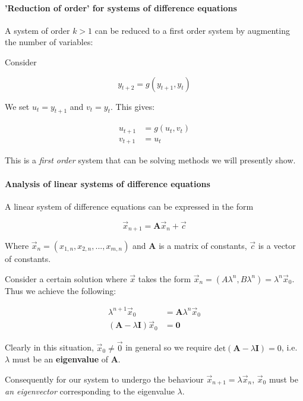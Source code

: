 \documentclass[11pt]{article}
\begin{document}
\paragraph{'Reduction of order' for systems of difference
equations}\label{reduction-of-order-for-systems-of-difference-equations}

A system of order \(k > 1\) can be reduced to a first order system by
augmenting the number of variables:

Consider

\[y_{t+2} = g(y_{t+1}, y_t)\]

We set \(u_t = y_{t+1}\) and \(v_t = y_t\). This gives:

\begin{align*}
    u_{t+1} &= g(u_t, v_t)\\
    v_{t+1} &= u_t
\end{align*}

This is a \emph{first order} system that can be solving methods we will
presently show.

\paragraph{Analysis of linear systems of difference
equations}\label{analysis-of-linear-systems-of-difference-equations}

A linear system of difference equations can be expressed in the form

\[\vec{x}_{n+1} = \mathbf{A}\vec{x}_n + \vec{c}\]

Where \(\vec{x}_n = (x_{1,n}, x_{2,n}, ..., x_{m, n})\) and
\(\mathbf{A}\) is a matrix of constants, \(\vec{c}\) is a vector of
constants.

Consider a certain solution where \(\vec{x}\) takes the form
\(\vec{x}_n = (A\lambda^n, B\lambda^n) = \lambda^n \vec{x}_0\). Thus we
achieve the following:

\begin{align*}
\lambda^{n+1}\vec{x}_0 &= \mathbf{A} \lambda^n \vec{x}_0\\
(\mathbf{A} - \lambda \mathbf{I}) \vec{x}_0 &= \mathbf{0}
\end{align*}

Clearly in this situation, \(\vec{x}_0 \ne \vec{0}\) in general so we
require \(\mathrm{det}(\mathbf{A} - \lambda\mathbf{I}) = 0\), i.e.
\(\lambda\) must be an \textbf{eigenvalue} of \(\mathbf{A}\).

Consequently for our system to undergo the behaviour
\(\vec{x}_{n+1} = \lambda \vec{x}_n\), \(\vec{x}_0\) must be \emph{an
eigenvector} corresponding to the eigenvalue \(\lambda\).
\end{document}
